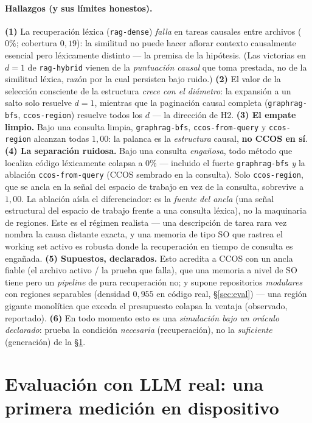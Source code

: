 \documentclass[11pt]{article}
\newcommand{\code}[1]{\texttt{#1}}
\begin{document}
\paragraph{Hallazgos (y sus límites honestos).}
\textbf{(1)} La recuperación léxica (\code{rag-dense}) \emph{falla} en tareas causales
entre archivos ($0\%$; cobertura $0{,}19$): la similitud no puede hacer aflorar
contexto causalmente esencial pero léxicamente distinto --- la premisa de la
hipótesis. (Las victorias en $d{=}1$ de \code{rag-hybrid} vienen de la \emph{puntuación
causal} que toma prestada, no de la similitud léxica, razón por la cual persisten bajo
ruido.)
\textbf{(2)} El valor de la selección consciente de la estructura \emph{crece con el
diámetro}: la expansión a un salto solo resuelve $d{=}1$, mientras que la paginación
causal completa (\code{graphrag-bfs}, \code{ccos-region}) resuelve todos los $d$ --- la
dirección de H2.
\textbf{(3) El empate limpio.} Bajo una consulta limpia, \code{graphrag-bfs},
\code{ccos-from-query} y \code{ccos-region} alcanzan todas $1{,}00$: la palanca es la
\emph{estructura} causal, \textbf{no CCOS en sí}.
\textbf{(4) La separación ruidosa.} Bajo una consulta \emph{engañosa}, todo método que
localiza código léxicamente colapsa a $0\%$ --- incluido el fuerte \code{graphrag-bfs}
\emph{y} la ablación \code{ccos-from-query} (CCOS sembrado en la consulta). Solo
\code{ccos-region}, que se ancla en la señal del espacio de trabajo en vez de la
consulta, sobrevive a $1{,}00$. La ablación aísla el diferenciador: es la \emph{fuente
del ancla} (una señal estructural del espacio de trabajo frente a una consulta léxica),
no la maquinaria de regiones. Este es el régimen realista --- una descripción de tarea
rara vez nombra la causa distante exacta, y una memoria de tipo SO que rastrea el
working set activo es robusta donde la recuperación en tiempo de consulta es engañada.
\textbf{(5) Supuestos, declarados.} Esto acredita a CCOS con un ancla fiable (el
archivo activo / la prueba que falla), que una memoria a nivel de SO tiene pero un
\emph{pipeline} de pura recuperación no; y supone repositorios \emph{modulares} con
regiones separables (densidad $0{,}955$ en código real, \S\ref{sec:eval}) --- una
región gigante monolítica que exceda el presupuesto colapsa la ventaja (observado,
reportado).
\textbf{(6)} En todo momento esto es una \emph{simulación bajo un oráculo declarado}:
prueba la condición \emph{necesaria} (recuperación), no la \emph{suficiente}
(generación) de la \S\ref{sec:protocol}.

\section{Evaluación con LLM real: una primera medición en dispositivo}\label{sec:protocol}
\end{document}
